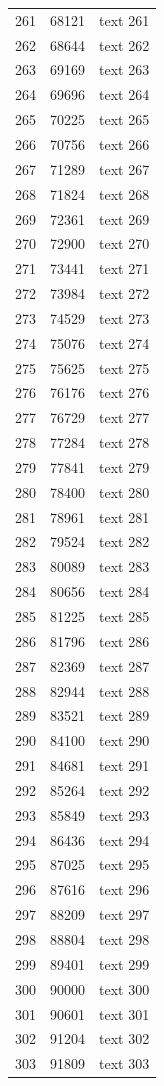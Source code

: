 \documentclass[10pt]{article}
\begin{document}
\begin{longtable}{rrl}
261&68121&text 261\\
262&68644&text 262\\
263&69169&text 263\\
264&69696&text 264\\
265&70225&text 265\\
266&70756&text 266\\
267&71289&text 267\\
268&71824&text 268\\
269&72361&text 269\\
270&72900&text 270\\
271&73441&text 271\\
272&73984&text 272\\
273&74529&text 273\\
274&75076&text 274\\
275&75625&text 275\\
276&76176&text 276\\
277&76729&text 277\\
278&77284&text 278\\
279&77841&text 279\\
280&78400&text 280\\
281&78961&text 281\\
282&79524&text 282\\
283&80089&text 283\\
284&80656&text 284\\
285&81225&text 285\\
286&81796&text 286\\
287&82369&text 287\\
288&82944&text 288\\
289&83521&text 289\\
290&84100&text 290\\
291&84681&text 291\\
292&85264&text 292\\
293&85849&text 293\\
294&86436&text 294\\
295&87025&text 295\\
296&87616&text 296\\
297&88209&text 297\\
298&88804&text 298\\
299&89401&text 299\\
300&90000&text 300\\
301&90601&text 301\\
302&91204&text 302\\
303&91809&text 303\\

\end{longtable}
\end{document}
